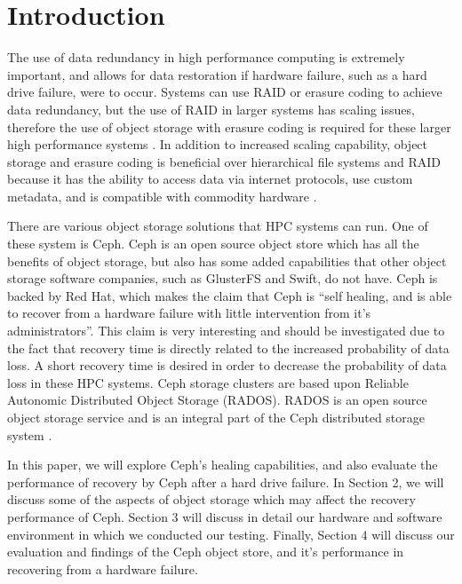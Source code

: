 \documentclass[conference,compsoc]{IEEEtran}
\begin{document}
\IEEEpeerreviewmaketitle


\section{Introduction}

The use of data redundancy in high performance computing is extremely important, and allows for data restoration if hardware failure, such as a hard drive failure, were to occur. Systems can use RAID or erasure coding to achieve data redundancy, but the use of RAID in larger systems has scaling issues, therefore the use of object storage with erasure coding is required for these larger high performance systems \cite {weatherspoon2002erasure}. In addition to increased scaling capability, object storage and erasure coding is beneficial over hierarchical file systems and RAID because it has the ability to access data via internet protocols, use custom metadata, and is compatible with commodity hardware \cite{mesnier2003object}.

There are various object storage solutions that HPC systems can run. One of these system is Ceph. Ceph is an open source object store which has all the benefits of object storage, but also has some added capabilities that other object storage software companies, such as GlusterFS and Swift, do not have. Ceph is backed by Red Hat, which makes the claim that Ceph is “self healing, and is able to recover from a hardware failure with little intervention from it’s administrators”. This claim is very interesting and should be investigated due to the fact that recovery time is directly related to the increased probability of data loss. A short recovery time is desired in order to decrease the probability of data loss in these HPC systems. Ceph storage clusters are based upon Reliable Autonomic Distributed Object Storage (RADOS). RADOS is an open source object storage service and is an integral part of the Ceph distributed storage system \cite{weil_rados}. 

In this paper, we will explore Ceph's healing capabilities, and also evaluate the performance of recovery by Ceph after a hard drive failure. In Section 2, we will discuss some of the aspects of object storage which may affect the recovery performance of Ceph. Section 3 will discuss in detail our hardware and software environment in which we conducted our testing. Finally, Section 4 will discuss our evaluation and findings of the Ceph object store, and it’s performance in recovering from a hardware failure.  
\end{document}
